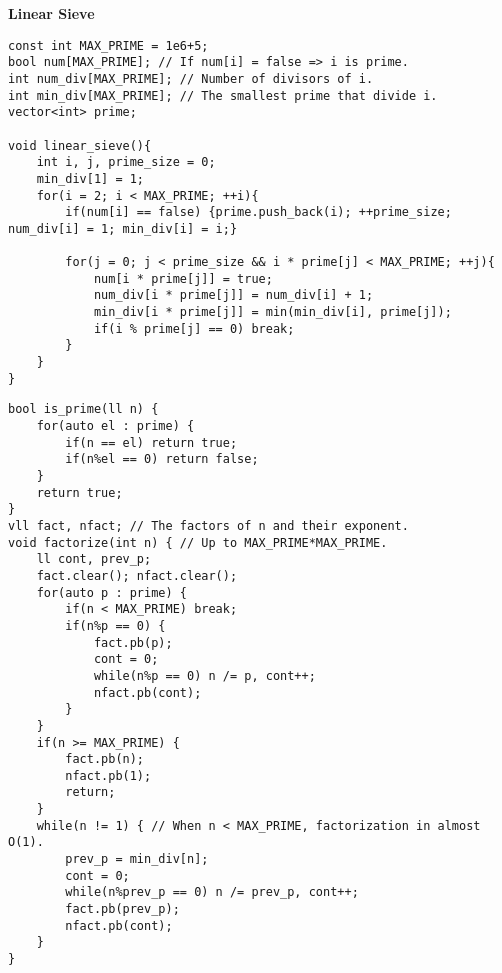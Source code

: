\documentclass[a4paper,10pt]{article}
\newcommand{\titleAlg}[1]{\vspace{-10pt}
\begin{center}\textbf{#1}\end{center} \vspace{-10pt}}
\begin{document}
\titleAlg{Linear Sieve}
\begin{verbatim}
const int MAX_PRIME = 1e6+5;
bool num[MAX_PRIME]; // If num[i] = false => i is prime.
int num_div[MAX_PRIME]; // Number of divisors of i.
int min_div[MAX_PRIME]; // The smallest prime that divide i.
vector<int> prime;
 
void linear_sieve(){
    int i, j, prime_size = 0;
    min_div[1] = 1;
    for(i = 2; i < MAX_PRIME; ++i){
        if(num[i] == false) {prime.push_back(i); ++prime_size; num_div[i] = 1; min_div[i] = i;}
        
        for(j = 0; j < prime_size && i * prime[j] < MAX_PRIME; ++j){
            num[i * prime[j]] = true;
            num_div[i * prime[j]] = num_div[i] + 1;
            min_div[i * prime[j]] = min(min_div[i], prime[j]);
            if(i % prime[j] == 0) break;
        }
    }
}
\end{verbatim}
\vspace*{-20pt}
\begin{multicols}{2}
\begin{verbatim}
bool is_prime(ll n) {
    for(auto el : prime) {
        if(n == el) return true;
        if(n%el == 0) return false;
    }
    return true;
}
vll fact, nfact; // The factors of n and their exponent.
void factorize(int n) { // Up to MAX_PRIME*MAX_PRIME.
    ll cont, prev_p;
    fact.clear(); nfact.clear();
    for(auto p : prime) {
        if(n < MAX_PRIME) break;
        if(n%p == 0) {
            fact.pb(p);
            cont = 0;
            while(n%p == 0) n /= p, cont++;
            nfact.pb(cont);
        }
    } 
    if(n >= MAX_PRIME) {
        fact.pb(n);
        nfact.pb(1);
        return;
    }
    while(n != 1) { // When n < MAX_PRIME, factorization in almost O(1).
        prev_p = min_div[n];
        cont = 0;
        while(n%prev_p == 0) n /= prev_p, cont++;
        fact.pb(prev_p);
        nfact.pb(cont);
    }
}
\end{verbatim}
\end{multicols}
\end{document}
